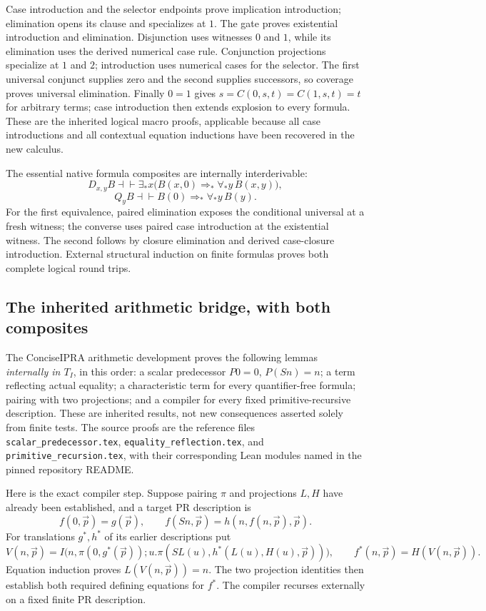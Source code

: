 \documentclass[11pt]{article}
\theoremstyle{definition}\newtheorem{definition}[theorem]{Definition}
\begin{document}
Case introduction and the selector endpoints prove implication
introduction; elimination opens its clause and specializes at $1$.
The gate proves existential introduction and elimination.  Disjunction
uses witnesses $0$ and $1$, while its elimination uses the derived
numerical case rule.  Conjunction projections specialize at $1$ and
$2$; introduction uses numerical cases for the selector.  The first
universal conjunct supplies zero and the second supplies successors,
so coverage proves universal elimination.  Finally $0=1$ gives
$s=C(0,s,t)=C(1,s,t)=t$ for arbitrary terms; case introduction then
extends explosion to every formula.  These are the inherited logical
macro proofs, applicable because all case introductions and all
contextual equation inductions have been recovered in the new calculus.

The essential native formula composites are internally interderivable:
\[
 D_{x,y}B\dashv\vdash
 \exists_*x\bigl(B(x,0)\Rightarrow_*\forall_*y\,B(x,y)\bigr),
\]
\[
 Q_yB\dashv\vdash B(0)\Rightarrow_*\forall_*y\,B(y).
\]
For the first equivalence, paired elimination exposes the conditional
universal at a fresh witness; the converse uses paired case introduction
at the existential witness.  The second follows by closure elimination
and derived case-closure introduction.  External structural induction
on finite formulas proves both complete logical round trips.

\subsection{The inherited arithmetic bridge, with both composites}
The ConciseIPRA arithmetic development proves the following lemmas~\cite{bridge,readme}
\emph{internally in $T_I$}, in this order: a scalar predecessor
$P0=0$, $P(Sn)=n$; a term reflecting actual equality; a characteristic
term for every quantifier-free formula; pairing with two projections;
and a compiler for every fixed primitive-recursive description.  These
are inherited results, not new consequences asserted solely from
finite tests.  The source proofs are the reference files
\texttt{scalar\_predecessor.tex}, \texttt{equality\_reflection.tex}, and
\texttt{primitive\_recursion.tex}, with their corresponding Lean
modules named in the pinned repository README.

Here is the exact compiler step.  Suppose pairing $\pi$ and projections
$L,H$ have already been established, and a target PR description is
\[
 f(0,\vec p)=g(\vec p),\qquad
 f(Sn,\vec p)=h(n,f(n,\vec p),\vec p).
\]
For translations $g^*,h^*$ of its earlier descriptions put
\[
 V(n,\vec p)=I\bigl(n,\pi(0,g^*(\vec p));
 u.\pi(SL(u),h^*(L(u),H(u),\vec p))\bigr),
 \qquad f^*(n,\vec p)=H(V(n,\vec p)).
\]
Equation induction proves $L(V(n,\vec p))=n$.  The two projection
identities then establish both required defining equations for $f^*$.
The compiler recurses externally on a fixed finite PR description.
\end{document}
